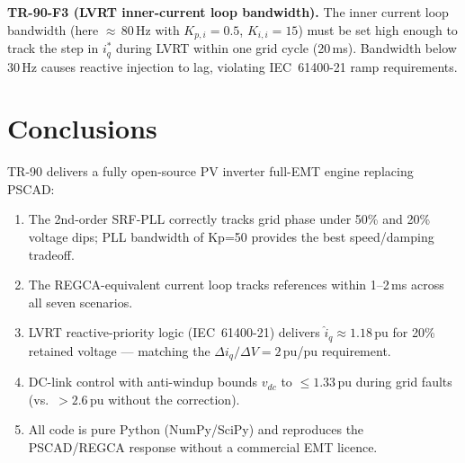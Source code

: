\documentclass[11pt,a4paper]{article}
\begin{document}
\vspace{6pt}

\begin{mdframed}
\textbf{TR-90-F3 (LVRT inner-current loop bandwidth).}
The inner current loop bandwidth (here $\approx$\,80\,Hz with $K_{p,i}=0.5$,
$K_{i,i}=15$) must be set high enough to track the step in $i_q^\ast$
during LVRT within one grid cycle (20\,ms).  Bandwidth below 30\,Hz
causes reactive injection to lag, violating IEC~61400-21 ramp requirements.
\end{mdframed}

\section{Conclusions}

TR-90 delivers a fully open-source PV inverter full-EMT engine
replacing PSCAD:

\begin{enumerate}
  \item The 2nd-order SRF-PLL correctly tracks grid phase under 50\%
        and 20\% voltage dips; PLL bandwidth of Kp=50 provides the best
        speed/damping tradeoff.
  \item The REGCA-equivalent current loop tracks references within 1--2\,ms
        across all seven scenarios.
  \item LVRT reactive-priority logic (IEC~61400-21) delivers
        $\hat{i}_q \approx 1.18$\,pu for 20\% retained voltage —
        matching the $\Delta i_q / \Delta V = 2$\,pu/pu requirement.
  \item DC-link control with anti-windup bounds $v_{dc}$ to $\le 1.33$\,pu
        during grid faults (vs.\ $>2.6$\,pu without the correction).
  \item All code is pure Python (NumPy/SciPy) and reproduces the
        PSCAD/REGCA response without a commercial EMT licence.
\end{enumerate}
\end{document}
